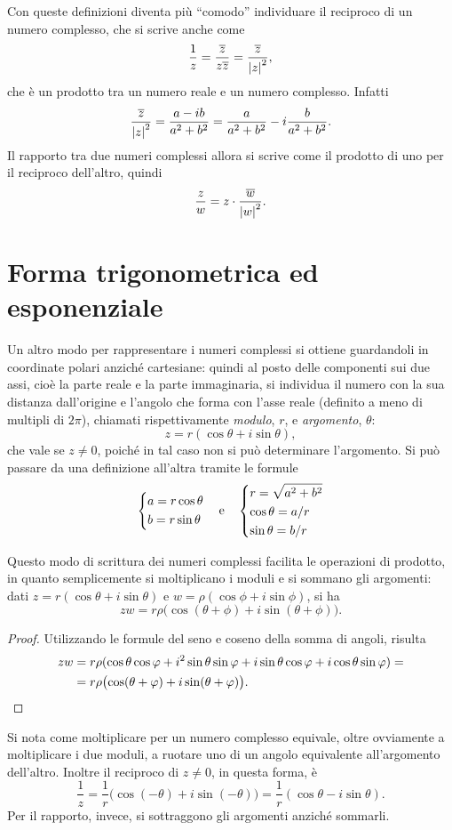 Con queste definizioni diventa più ``comodo'' individuare il reciproco di un numero complesso, che si scrive anche come
\[
\frac1{z}=\frac{\conj{z}}{z\conj{z}}=\frac{\conj{z}}{\abs{z}^2},
\]
che è un prodotto tra un numero reale e un numero complesso.
Infatti
\[
\frac{\conj{z}}{\abs{z}^2}=\frac{a-ib}{a^2+b^2}=\frac{a}{a^2+b^2}-i\frac{b}{a^2+b^2}.
\]
Il rapporto tra due numeri complessi allora si scrive come il prodotto di uno per il reciproco dell'altro, quindi
\[
\frac{z}{w}=z\cdot\frac{\conj{w}}{\abs{w}^2}.
\]

\section{Forma trigonometrica ed esponenziale}
Un altro modo per rappresentare i numeri complessi si ottiene guardandoli in coordinate polari anziché cartesiane: quindi al posto delle componenti sui due assi, cioè la parte reale e la parte immaginaria, si individua il numero con la sua distanza dall'origine e l'angolo che forma con l'asse reale (definito a meno di multipli di $2\pi$), chiamati rispettivamente \emph{modulo}, $r$, e \emph{argomento}, $\theta$:
\[
z=r(\cos\theta+i\sin\theta),
\]
che vale se $z\neq 0$, poiché in tal caso non si può determinare l'argomento.
Si può passare da una definizione all'altra tramite le formule
\[
\begin{dcases}
	a=r\cos\theta\\
	b=r\sin\theta
\end{dcases}
\quad\text{e}\quad
\begin{dcases}
	r=\sqrt{a^2+b^2}\\
	\cos\theta=a/r\\
	\sin\theta=b/r
\end{dcases}
\]


Questo modo di scrittura dei numeri complessi facilita le operazioni di prodotto, in quanto semplicemente si moltiplicano i moduli e si sommano gli argomenti: dati $z=r(\cos\theta+i\sin\theta)$ e $w=\rho(\cos\phi+i\sin\phi)$, si ha
\[
zw=r\rho\big(\!\cos(\theta+\phi)+i\sin(\theta+\phi)\big).
\]
\begin{proof}
Utilizzando le formule del seno e coseno della somma di angoli, risulta
\[
\begin{split}
zw&=r\rho(\cos\theta\cos\phi+i^2\sin\theta\sin\phi+i\sin\theta\cos\phi+i\cos\theta\sin\phi)=\\
&=r\rho\big(\!\cos(\theta+\phi)+i\sin(\theta+\phi)\big)\qedhere.
\end{split}
\]
\end{proof}
Si nota come moltiplicare per un numero complesso equivale, oltre ovviamente a moltiplicare i due moduli, a ruotare uno di un angolo equivalente all'argomento dell'altro.
Inoltre il reciproco di $z\neq 0$, in questa forma, è
\[
\frac1{z}=\frac1{r}\big(\!\cos(-\theta)+i\sin(-\theta)\big)=\frac1{r}(\cos\theta-i\sin\theta).
\]
Per il rapporto, invece, si sottraggono gli argomenti anziché sommarli.

